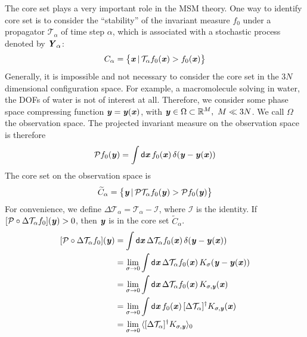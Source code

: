 \documentclass[aip,jcp,a4paper,reprint,onecolumn]{revtex4-1}
\newcommand{\vect}[1]{\textbf{\textit{#1}}}
\newcommand{\dd}{\textsf{d}}
\newcommand{\mt}{\mathcal T}
\begin{document}
The core set plays a very important role in the MSM theory. One way to
identify core set is to consider the ``stability'' of the invariant
measure $f_0$ under a propagator $\mt_\alpha$
of time step $\alpha$, which is associated with a
stochastic process denoted by $\vect Y_\alpha$:
\begin{align}
  C_\alpha = \big\{
  \vect x \,\vert\, \mt_\alpha f_0(\vect x) > f_0(\vect x)
  \big\}
\end{align}
Generally, it is impossible and not necessary to consider the core set
in the $3N$ dimensional configuration space. For example, a
macromolecule solving in water, the DOFs of water is not of interest
at all. Therefore, we consider some phase space compressing function
$\vect y = \vect y(\vect x)$, with $\vect y \in \Omega \subset \mathbb
R^M,\ M\ll 3N$. We call $\Omega$ the observation space.  The projected
invariant measure on the observation space is therefore
\begin{align}
  \mathcal P f_0 (\vect y)
  =
  \int
  \dd \vect x\,
  f_0(\vect x) \,
  \delta (\vect y - \vect y(\vect x)) 
\end{align}
The core set on the observation space is
\begin{align}
  \widetilde
  C_\alpha = \big\{
  \vect y \,\vert\,
  \mathcal P\mt_\alpha f_0(\vect y) > \mathcal P f_0(\vect y)
  \big\}
\end{align}
For convenience, we define $\Delta \mt_\alpha =
\mt_\alpha - \mathcal I$, where $\mathcal I$ is the
identity. If $[\mathcal P\circ\Delta \mt_\alpha f_0](\vect y) > 0$, then
$\vect y$ is in the core set $\widetilde C_\alpha $.
\begin{align}\nonumber
  [\mathcal P\circ\Delta \mt_\alpha f_0](\vect y)
  &=
  \int
  \dd \vect x\,
  \Delta \mt_\alpha f_0(\vect x) \,
  \delta (\vect y - \vect y(\vect x))  \\\nonumber
  &=
  \lim_{\sigma \rightarrow 0}
  \int
  \dd \vect x\,
  \Delta \mt_\alpha f_0(\vect x) \,
  K_{\sigma} (\vect y - \vect y(\vect x))  \\\nonumber
  &=
  \lim_{\sigma \rightarrow 0}
  \int
  \dd \vect x\,
  \Delta \mt_\alpha f_0(\vect x) \,
  K_{\sigma, \vect y} (\vect x)  \\\nonumber
  &=
  \lim_{\sigma \rightarrow 0}
  \int
  \dd \vect x\,
  f_0(\vect x) \,
  [\Delta \mt_\alpha]^\dagger K_{\sigma, \vect y} (\vect x)\\
  &=
  \lim_{\sigma \rightarrow 0}\,
  \langle
  [\Delta \mt_\alpha]^\dagger K_{\sigma, \vect y}
  \rangle_0
\end{align}
\end{document}
